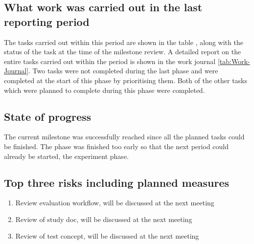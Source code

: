 \subsection{What work was carried out in the last reporting period}
The tasks carried out within this period are shown in the table , along with the status of the task at the time of the milestone review. A detailed report on the entire tasks carried out within the period is shown in the work journal \ref{tab:Work-Journal}. Two tasks were not completed during the last phase and were completed at the start of this phase by prioritising them. Both of the other tasks which were planned to complete during this phase were completed.

\subsection{State of progress}
The current milestone was successfully reached since all the planned tasks could be finished. The phase was finished too early so that the next period could already be started, the experiment phase. 

\subsection{Top three risks including planned measures}
\begin{enumerate}
    \setlength\itemsep{0em}
    \item Review evaluation workflow, will be discussed at the next meeting
    \item Review of study doc, will be discussed at the next meeting
    \item Review of test concept, will be discussed at the next meeting 
\end{enumerate}

